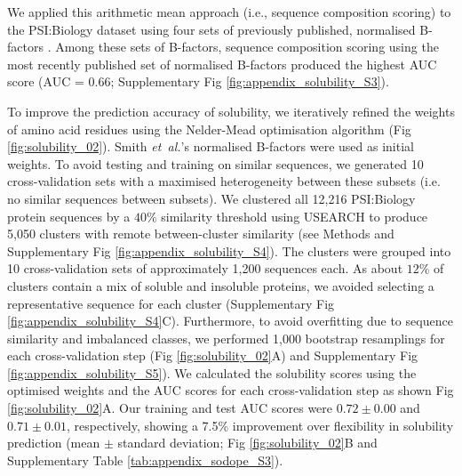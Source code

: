 We applied this arithmetic mean approach (i.e., sequence composition scoring) to the PSI:Biology dataset using four sets of previously published, normalised B-factors \citep{Bhaskaran1988-bn,Ragone1989-bx,vihinen1994accuracy,Smith2003-gb}. Among these sets of B-factors, sequence composition scoring using the most recently published set of normalised B-factors produced the highest AUC score (AUC = $0.66$; Supplementary Fig \ref{fig:appendix_solubility_S3}).

To improve the prediction accuracy of solubility, we iteratively refined the weights of amino acid residues using the Nelder-Mead optimisation algorithm \citep{Nelder1965-zb} (Fig \ref{fig:solubility_02}). Smith {\it et~al.}’s normalised B-factors were used as initial weights. To avoid testing and training on similar sequences, we generated 10 cross-validation sets with a maximised heterogeneity between these subsets (i.e. no similar sequences between subsets). We clustered all 12,216 PSI:Biology protein sequences by a $40\%$ similarity threshold using USEARCH to produce 5,050 clusters with remote between-cluster similarity (see Methods  and Supplementary Fig \ref{fig:appendix_solubility_S4}). The clusters were grouped into 10 cross-validation sets of approximately 1,200 sequences each. As about $12\%$ of clusters contain a mix of soluble and insoluble proteins, we avoided selecting a representative sequence for each cluster (Supplementary Fig \ref{fig:appendix_solubility_S4}C). Furthermore, to avoid overfitting due to sequence similarity and imbalanced classes, we performed 1,000 bootstrap resamplings for each cross-validation step (Fig \ref{fig:solubility_02}A) and Supplementary Fig \ref{fig:appendix_solubility_S5}). We calculated the solubility scores using the optimised weights and the AUC scores for each cross-validation step as shown Fig \ref{fig:solubility_02}A. Our training and test AUC scores were $0.72 \pm 0.00$ and $0.71 \pm 0.01$, respectively, showing a 7.5\% improvement over flexibility in solubility prediction (mean $\pm$ standard deviation; Fig \ref{fig:solubility_02}B and  Supplementary Table \ref{tab:appendix_sodope_S3}).

